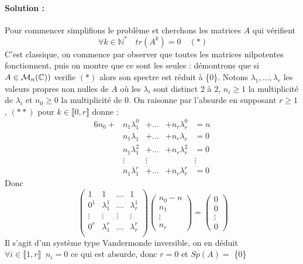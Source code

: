 \documentclass[letterpaper,10pt]{article}
\begin{document}
\paragraph{Solution :}
Pour commencer simplifions le problème et cherchons les matrices $A$ qui vérifient \[\
\forall k \in \mathbb{N^*}\quad tr(A^k) = 0
\quad (*) \] C'est classique, on commence par observer que toutes les matrices 
nilpotentes fonctionnent, puis on montre que ce sont les seules :
 démontrons que si $A \in \mathcal{M}_n(\mathbb{C})) $ verifie $(*)$ alors son
  spectre est réduit à \{0\}. Notons $ \lambda_1,..., \lambda_r$ les valeurs propres non nulles de $A$ où les $\lambda_i$ sont distinct 2 à 2, $n_i \geq 1$ la multiplicité de $\lambda_i$ et $n_0 \geq 0$ la multiplicité de 0. On raisonne par l'absurde en supposant $r \geq 1$,
$(**)$ pour $k\in \llbracket 0, r \rrbracket $ donne : 
\begin{alignat*}{6}
n_0 + &n_1\lambda_1^0 &+\ldots &+n_r\lambda_r^0 & = n\\
&n_1\lambda_1 &+\ldots&+n_r\lambda_r  &= 0\\
&n_1\lambda_1^2 &+\ldots&+n_r\lambda_r^2 &= 0 \\
&\vdots &\vdots  & & \vdots \\
&n_1\lambda_1^{r} &+\ldots&+n_r\lambda_r^{r} &= 0
\end{alignat*}
Donc 
\[\ \begin{pmatrix}
1 & 1 &\ldots & 1 \\
0^1 & \lambda_1^1 & \ldots & \lambda_r^1 \\
\vdots & \vdots & \vdots & \vdots \\
0^r & \lambda_1^r & \ldots & \lambda_r^r \\
\end{pmatrix}\begin{pmatrix}n_0-n \\ n_1\\ \vdots \\ n_r
\end{pmatrix}
=\begin{pmatrix}0 \\ 0\\ \vdots \\ 0
\end{pmatrix}\]
Il s'agit d'un système type Vandermonde  inversible,
on en déduit $\forall i \in\llbracket 1, r\rrbracket \;\; n_i = 0 $ ce qui est absurde, donc $r = 0$ et $Sp(A) =$ \{0\}
\end{document}
